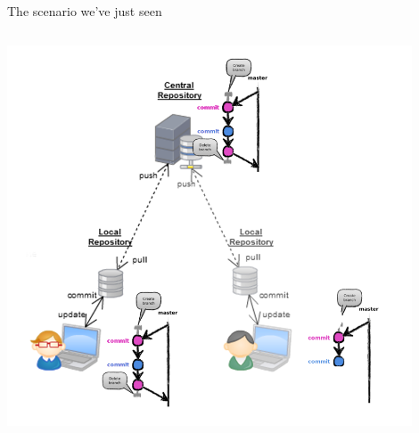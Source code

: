 \begin{frame}[fragile]{The scenario we've just seen}
\begin{columns}
\begin{column}{0.4\textwidth}
\begin{center}
{				\includegraphics[width=0.9\textwidth]{multiuser_remote_delete.png}
			}
	\end{center}
\end{column}
\end{columns}
\end{frame}


